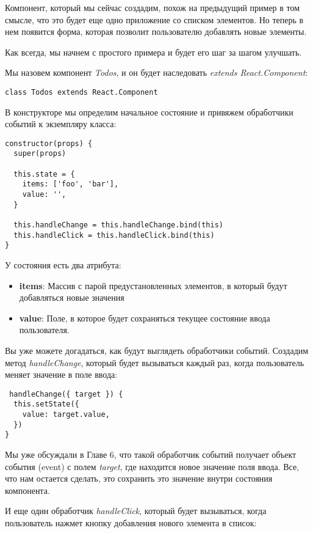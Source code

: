 Компонент, который мы сейчас создадим, похож на предыдущий пример в том смысле, что это будет еще одно приложение со списком элементов. Но теперь в нем появится форма, которая позволит пользователю добавлять новые элементы.

Как всегда, мы начнем с простого примера и будет его шаг за шагом улучшать.

Мы назовем компонент \textit{Todos}, и он будет наследовать \textit{extends React.Component}:

\begin{lstlisting}
class Todos extends React.Component
\end{lstlisting}

В конструкторе мы определим начальное состояние и привяжем обработчики событий к экземпляру класса:

\begin{lstlisting}
constructor(props) {
  super(props)
  
  this.state = {
    items: ['foo', 'bar'],
    value: '',
  }

  this.handleChange = this.handleChange.bind(this)
  this.handleClick = this.handleClick.bind(this)
}
\end{lstlisting}

У состояния есть два атрибута:

\begin{itemize}
  \item \textbf{items}: Массив с парой предустановленных элементов, в который будут добавляться новые значения
  \item \textbf{value}: Поле, в которое будет сохраняться текущее состояние ввода пользователя.
\end{itemize}

Вы уже можете догадаться, как будут выглядеть обработчики событий. Создадим метод \textit{handleChange}, который будет вызываться каждый раз, когда пользователь меняет значение в поле ввода:

\begin{lstlisting}
 handleChange({ target }) {
  this.setState({
    value: target.value,
  })
}
\end{lstlisting}

Мы уже обсуждали в Главе 6, что такой обработчик событий получает объект события (event) с полем \textit{target}, где находится новое значение поля ввода. Все, что нам остается сделать, это сохранить это значение внутри состояния компонента.

И еще один обработчик \textit{handleClick}, который будет вызываться, когда пользователь нажмет кнопку добавления нового элемента в список:

